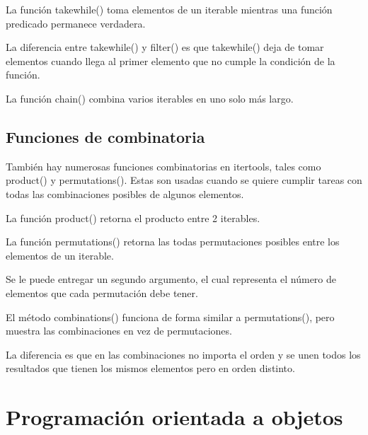 \documentclass{report}
\begin{document}
{

La función takewhile() toma elementos de un iterable mientras una función predicado permanece verdadera.


La diferencia entre takewhile() y filter() es que takewhile() deja de tomar elementos cuando llega al primer elemento que no cumple la condición de la función.


La función chain() combina varios iterables en uno solo más largo.


\section{Funciones de combinatoria}

También hay numerosas funciones combinatorias en itertools, tales como product() y permutations(). Estas son usadas cuando se quiere cumplir tareas con todas las combinaciones posibles de algunos elementos.

La función product() retorna el producto entre 2 iterables.


La función permutations() retorna las todas permutaciones posibles entre los elementos de un iterable.



Se le puede entregar un segundo argumento, el cual representa el número de elementos que cada permutación debe tener.


El método combinations() funciona de forma similar a permutations(), pero muestra las combinaciones en vez de permutaciones.


La diferencia es que en las combinaciones no importa el orden y se unen todos los resultados que tienen los mismos elementos pero en orden distinto.

\clearpage\chapter{Programación orientada a objetos}

}
\end{document}
